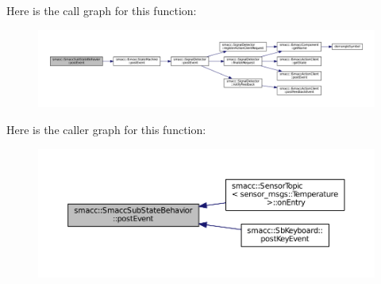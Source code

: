 Here is the call graph for this function\+:
\nopagebreak
\begin{figure}[H]
\begin{center}
\leavevmode
\includegraphics[width=350pt]{classsmacc_1_1SmaccSubStateBehavior_a8538664f9828247727a27446112788a2_cgraph}
\end{center}
\end{figure}




Here is the caller graph for this function\+:
\nopagebreak
\begin{figure}[H]
\begin{center}
\leavevmode
\includegraphics[width=350pt]{classsmacc_1_1SmaccSubStateBehavior_a8538664f9828247727a27446112788a2_icgraph}
\end{center}
\end{figure}


